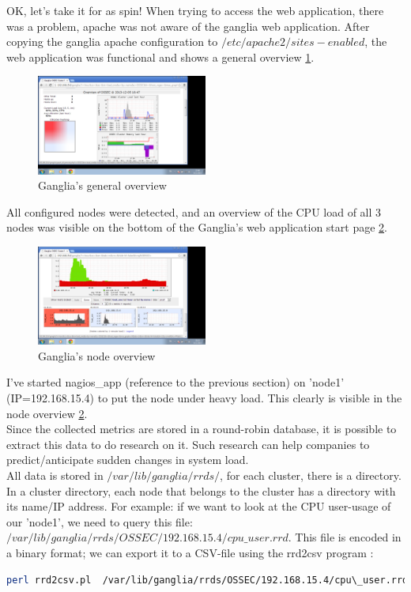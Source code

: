 \documentclass[12pt]{report}
\begin{document}
OK, let's take it for as spin! When trying to access the web
application, there was a problem, apache was not aware of the ganglia
web application. After copying the ganglia apache configuration to
$/etc/apache2/sites-enabled$, the web application was functional and
shows a general overview \cref{fig:ganglia_general}.
\begin{figure}[h!]
  \caption{Ganglia's general overview}
  \label{fig:ganglia_general}
  \centering
    \includegraphics[width=0.5\textwidth]{pics/ganglia_general.png}
\end{figure}
All configured nodes were detected, and an overview of the CPU load of
all 3 nodes was visible on the bottom of the Ganglia's web application
start page  \cref{fig:ganglia_node_overview}.
\begin{figure}[h!]
  \caption{Ganglia's node overview}
  \label{fig:ganglia_node_overview}
  \centering
    \includegraphics[width=0.5\textwidth]{pics/ganglia_node_overview.png}
\end{figure}
I've started nagios\_app (reference to the previous section) on 'node1'
(IP=192.168.15.4) to put the node under heavy load. This clearly is
visible in the node overview \cref{fig:ganglia_node_overview}.\\

Since the collected metrics are stored in a round-robin database, it is possible to
extract this data to do research on it. Such research can help
companies to predict/anticipate sudden changes in system load.\\

All data is stored in $/var/lib/ganglia/rrds/$, for each cluster,
there is a directory. In a cluster directory, each node that belongs
to the cluster has a directory with its name/IP address.
For example: if we want to look at the CPU user-usage of our 'node1',
we need to query this file:
$/var/lib/ganglia/rrds/OSSEC/192.168.15.4/cpu\_user.rrd$. This file is
encoded in a binary format; we can export it to a CSV-file using the
rrd2csv program \cite{rrd2csv}:
\begin{lstlisting}[language=bash]
perl rrd2csv.pl  /var/lib/ganglia/rrds/OSSEC/192.168.15.4/cpu\_user.rrd > node1_cpu_user.csv
\end{lstlisting} 
\end{document}

